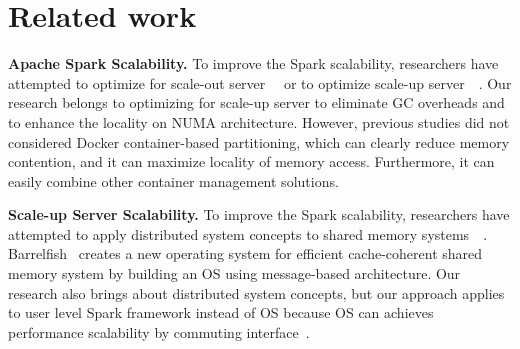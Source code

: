 \section{Related work} \label{sec:RelatedWork}

\noindent 
\textbf{Apache Spark Scalability.}
To improve the Spark scalability, researchers have attempted to optimize for
scale-out server~\cite{Ousterhout2015MSP}~\cite{Maas2016THL} or to optimize scale-up server~\cite{Ahsan2016SVS}~\cite{Chaimov2016SSH}.
Our research belongs to optimizing for scale-up server to eliminate GC overheads
and to enhance the locality on NUMA architecture.
However, previous studies did not considered Docker container-based partitioning,
which can clearly reduce memory contention, and it can maximize locality of memory access.
Furthermore, it can easily combine other container management solutions.

\noindent
\textbf{Scale-up Server Scalability.}
To improve the Spark scalability, researchers have attempted to apply distributed
system concepts to shared
memory systems~\cite{Baumann2009Barrelfish}~\cite{SilasBoydWickizerPth}.
Barrelfish~\cite{Baumann2009Barrelfish} creates a new operating system for efficient cache-coherent
shared memory system by building an OS using message-based architecture.
Our research also brings about distributed system concepts, but our approach applies
to user level Spark framework instead of OS because OS can achieves 
performance scalability by commuting interface~\cite{Clements2013SCR}.
